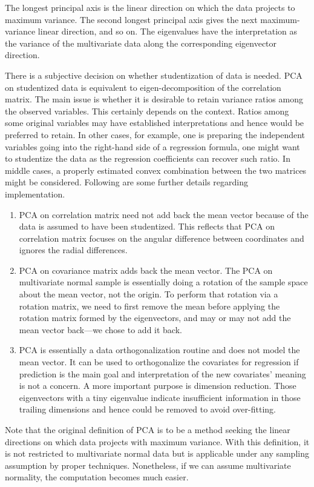 \documentclass[article]{jss}
\numberwithin{equation}{subsection}
\begin{document}
        The longest principal axis is the linear direction on which the data projects to maximum variance. The second longest principal axis gives the next maximum-variance linear direction, and so on. The eigenvalues have the interpretation as the variance of the multivariate data along the corresponding eigenvector direction.
        
        There is a subjective decision on whether studentization of data is needed. PCA on studentized data is equivalent to eigen-decomposition of the correlation matrix. The main issue is whether it is desirable to retain variance ratios among the observed variables. This certainly depends on the context. Ratios among some original variables may have established interpretations and hence would be preferred to retain. In other cases, for example, one is preparing the independent variables going into the right-hand side of a regression formula, one might want to studentize the data as the regression coefficients can recover such ratio. In middle cases, a properly estimated convex combination between the two matrices might be considered.
        Following are some further details regarding implementation.
        \begin{enumerate}
                \item PCA on correlation matrix need not add back the mean vector because of the data is assumed to have been studentized. This reflects that PCA on correlation matrix focuses on the angular difference between coordinates and ignores the radial differences.
                \item PCA on covariance matrix adds back the mean vector. The PCA on multivariate normal sample is essentially doing a rotation of the sample space about the mean vector, not the origin. To perform that rotation via a rotation matrix, we need to first remove the mean before applying the rotation matrix formed by the eigenvectors, and may or may not add the mean vector back---we chose to add it back.
                \item PCA is essentially a data orthogonalization routine and does not model the mean vector. It can be used to orthogonalize the covariates for regression if prediction is the main goal and interpretation of the new covariates' meaning is not a concern. A more important purpose is dimension reduction. Those eigenvectors with a tiny eigenvalue indicate insufficient information in those trailing dimensions and hence could be removed to avoid over-fitting.
        \end{enumerate}
        Note that the original definition of PCA is to be a method seeking the linear directions on which data projects with maximum variance. With this definition, it is not restricted to multivariate normal data but is applicable under any sampling assumption by proper techniques. Nonetheless, if we can assume multivariate normality, the computation becomes much easier.
        
\end{document}
